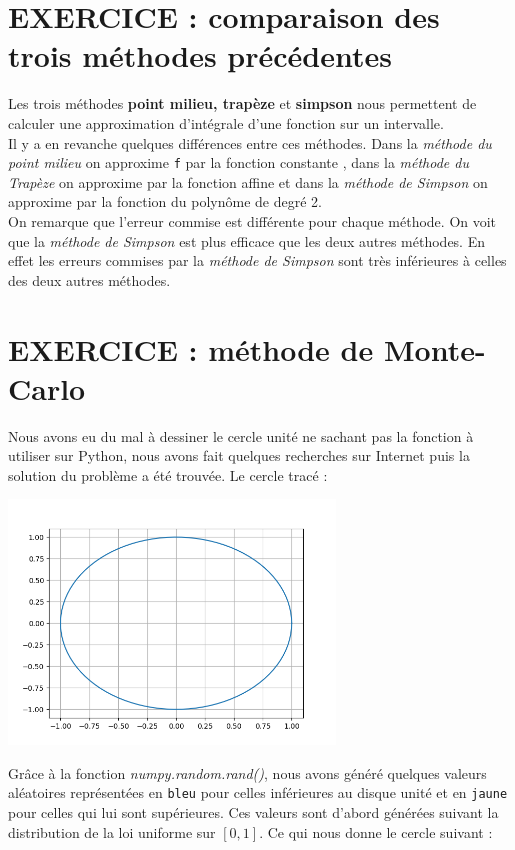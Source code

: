 \documentclass{article}
\begin{document}
\section{EXERCICE : comparaison des trois méthodes précédentes}

Les trois méthodes \textbf{point milieu, trapèze} et \textbf{simpson} nous permettent de calculer une approximation d'intégrale d'une fonction sur un intervalle. 
\\

	
	Il y a en revanche quelques différences entre ces méthodes. Dans la \textit{méthode du point milieu} on approxime \texttt{f} par la fonction constante , dans la \textit{méthode du Trapèze} on approxime par la fonction affine et dans la \textit{méthode de Simpson} on approxime par la fonction du polynôme de degré 2. 
\\

	On remarque que l'erreur commise est différente pour chaque méthode. On voit que la \textit{méthode de Simpson} est plus efficace que les deux autres méthodes. En effet les erreurs commises par la \textit{méthode de Simpson} sont très inférieures à celles des deux autres méthodes.

\section{EXERCICE : méthode de Monte-Carlo}

Nous avons eu du mal à dessiner le cercle unité ne sachant pas la fonction à utiliser sur Python, nous avons fait quelques recherches sur Internet puis la solution du problème a été trouvée. Le cercle tracé :

\begin{center}
    \includegraphics[width=0.65\textwidth]{CercleExo6(0).png}
\end{center}

Grâce à la fonction \textit{numpy.random.rand()}, nous avons généré quelques valeurs aléatoires représentées en \texttt{bleu} pour celles inférieures au disque unité et en \texttt{jaune} pour celles qui lui sont supérieures. Ces valeurs sont d'abord générées suivant la distribution de la loi uniforme sur $[0,1]$.  Ce qui nous donne le cercle suivant :
\end{document}
